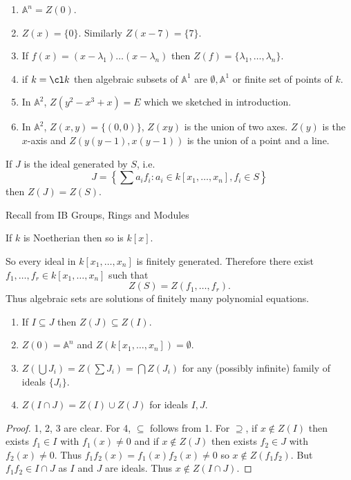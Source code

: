 \documentclass[a4paper]{article}
\renewcommand{\A}{\mathbb{A}}
\begin{document}
\begin{eg}\leavevmode
  \begin{enumerate}
  \item \(\A^n = Z(0)\).
  \item \(Z(x) = \{0\}\). Similarly \(Z(x - 7) = \{7\}\).
  \item If \(f(x) = (x - \lambda_1) \dots (x - \lambda_n)\) then \(Z(f) = \{\lambda_1, \dots, \lambda_n\}\).
  \item if \(k = \cl k\) then algebraic subsets of \(\A^1\) are \(\emptyset, \A^1\) or finite set of points of \(k\).
  \item In \(\A^2\), \(Z(y^2 - x^3 + x) = E\) which we sketched in introduction.
  \item In \(\A^2\), \(Z(x, y) = \{(0, 0)\}\), \(Z(xy)\) is the union of two axes. \(Z(y)\) is the \(x\)-axis and \(Z(y(y - 1), x(y - 1))\) is the union of a point and a line.
  \end{enumerate}
\end{eg}

If \(J\) is the ideal generated by \(S\), i.e.
\[
  J = \left\{\sum a_i f_i: a_i \in k[x_1, \dots, x_n], f_i \in S\right\}
\]
then \(Z(J) = Z(S)\).

Recall from IB Groups, Rings and Modules

\begin{theorem}
  If \(k\) is Noetherian then so is \(k[x]\).
\end{theorem}

So every ideal in \(k[x_1, \dots, x_n]\) is finitely generated. Therefore there exist \(f_1, \dots, f_r \in k[x_1, \dots, x_n]\) such that
\[
  Z(S) = Z(f_1, \dots, f_r).
\]
Thus algebraic sets are solutions of finitely many polynomial equations.

\begin{lemma}\leavevmode
  \begin{enumerate}
  \item If \(I \subseteq J\) then \(Z(J) \subseteq Z(I)\).
  \item \(Z(0) = \A^n\) and \(Z(k[x_1, \dots, x_n]) = \emptyset\).
  \item \(Z(\bigcup J_i) = Z(\sum J_i) = \bigcap Z(J_i)\) for any (possibly infinite) family of ideals \(\{J_i\}\).
  \item \(Z(I \cap J) = Z(I) \cup Z(J)\) for ideals \(I, J\).
  \end{enumerate}
\end{lemma}

\begin{proof}
  1, 2, 3 are clear. For 4, \(\subseteq\) follows from 1. For \(\supseteq\), if \(x \notin Z(I)\) then exists \(f_1 \in I\) with \(f_1(x) \neq 0\) and if \(x \notin Z(J)\) then exists \(f_2 \in J\) with \(f_2(x) \neq 0\). Thus \(f_1f_2(x) = f_1(x)f_2(x) \neq 0\) so \(x \notin Z(f_1f_2)\). But \(f_1f_2 \in I \cap J\) as \(I\) and \(J\) are ideals. Thus \(x \notin Z(I \cap J)\).
\end{proof}
\end{document}
